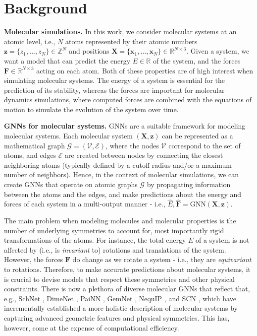 \documentclass{article}
\newcommand{\GNN}{\text{GNN}}
\begin{document}
\section{Background}
\textbf{Molecular simulations.}
In this work, we consider molecular systems at an atomic level, i.e., $N$ atoms represented by their atomic numbers $\boldsymbol{z} = \{z_1, . . . , z_N \} \in \mathbb{Z}^N$ and positions $\boldsymbol{X} =\{ {\boldsymbol{x}_1, \dots, \boldsymbol{x}_N}\} \in \mathbb{R}^{N\times 3}$. Given a system, we want a model that can predict the energy $E \in \mathbb{R}$ of the system, and the forces $\boldsymbol{F} \in \mathbb{R}^{N\times 3}$ acting on each atom. Both of these properties are of high interest when simulating molecular systems. The energy of a system is essential for the prediction of its stability, whereas the forces are important for molecular dynamics simulations, where computed forces are combined with the equations of motion to simulate the evolution of the system over time.

\textbf{GNNs for molecular systems.}
GNNs are a suitable framework for modeling molecular systems. Each molecular system $(\boldsymbol{X}, \boldsymbol{z})$ can be represented as a mathematical graph $\mathcal{G} = (\mathcal{V}, \mathcal{E})$, where the nodes $\mathcal{V}$ correspond to the set of atoms, and edges $\mathcal{E}$ are created between nodes by connecting the closest neighboring atoms (typically defined by a cutoff radius and/or a maximum number of neighbors). Hence, in the context of molecular simulations, we can create GNNs that operate on atomic graphs $\mathcal{G}$ by propagating information between the atoms and the edges, and make predictions about the energy and forces of each system in a multi-output manner - i.e., $\hat{E}, \boldsymbol{\hat{F}} = \GNN(\boldsymbol{X}, \boldsymbol{z})$.

The main problem when modeling molecules and molecular properties is the number of underlying symmetries to account for, most importantly rigid transformations of the atoms. For instance, the total energy $E$ of a system is not affected by (i.e., is \emph{invariant} to) rotations and translations of the system. However, the forces $\boldsymbol{F}$ do change as we rotate a system - i.e., they are \emph{equivariant} to rotations. Therefore, to make accurate predictions about molecular systems, it is crucial to devise models that respect these symmetries and other physical constraints. There is now a plethora of diverse molecular GNNs that reflect that, e.g., SchNet \cite{schütt2017schnet}, DimeNet \cite{gasteiger_directional_2020, gasteiger_dimenetpp_2020}, PaiNN \cite{schutt_equivariant_2021}, GemNet \cite{gasteiger_gemnet_2021, gasteiger_gemnet_oc_2022}, NequIP \cite{batzner_e3-equivariant_2022}, and SCN \cite{zitnick2022spherical}, which have incrementally established a more holistic description of molecular systems by capturing advanced geometric features and physical symmetries. This has, however, come at the expense of computational efficiency.
\end{document}
